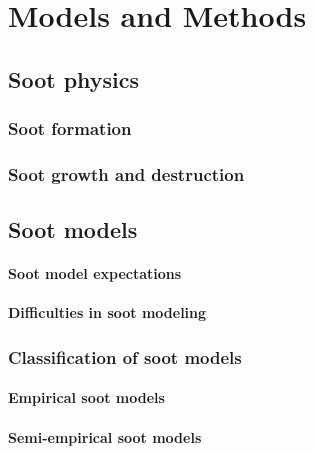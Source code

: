 \addchapheadtotoc
\chapter{Models and Methods}\label{chapter:models_and_methods}



\section{Soot physics}


\subsection{Soot formation}


\subsection{Soot growth and destruction}


\section{Soot models}

\subsubsection{Soot model expectations}

\subsubsection{Difficulties in soot modeling}





\subsection{Classification of soot models}

\subsubsection{Empirical soot models}


\subsubsection{Semi-empirical soot models}



